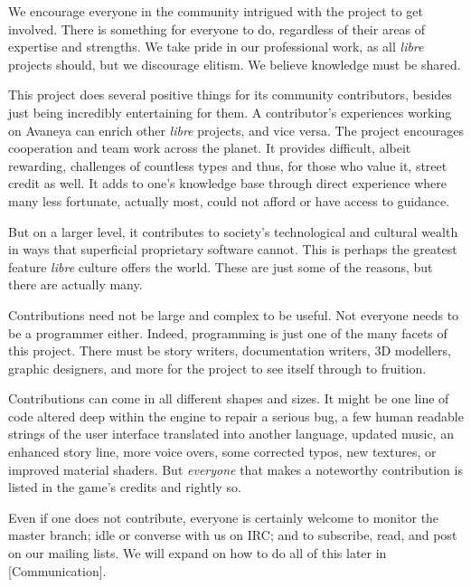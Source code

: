 
We encourage everyone in the community intrigued with the project to get involved. There is something for everyone to do, regardless of their areas of expertise and strengths. We take pride in our professional work, as all {\it libre} projects should, but we discourage elitism. We believe knowledge must be shared.

This project does several positive things for its community contributors, besides just being incredibly entertaining for them. A contributor's experiences working on Avaneya can enrich other {\it libre} projects, and vice versa. The project encourages cooperation and team work across the planet. It provides difficult, albeit rewarding, challenges of countless types and thus, for those who value it, street credit as well. It adds to one's knowledge base through direct experience where many less fortunate, actually most, could not afford or have access to guidance.

But on a larger level, it contributes to society's technological and cultural wealth in ways that superficial proprietary software cannot. This is perhaps the greatest feature {\it libre} culture offers the world. These are just some of the reasons, but there are actually many.

Contributions need not be large and complex to be useful. Not everyone needs to be a programmer either. Indeed, programming is just one of the many facets of this project. There must be story writers, documentation writers, 3D modellers, graphic designers, and more for the project to see itself through to fruition. 

Contributions can come in all different shapes and sizes. It might be one line of code altered deep within the engine to repair a serious bug, a few human readable strings of the user interface translated into another language, updated music, an enhanced story line, more voice overs, some corrected typos, new textures, or improved material shaders. But {\it everyone} that makes a noteworthy contribution is listed in the game's credits and rightly so.

Even if one does not contribute, everyone is certainly welcome to monitor the master branch; idle or converse with us on IRC; and to subscribe, read, and post on our mailing lists. We will expand on how to do all of this later in [Communication].

